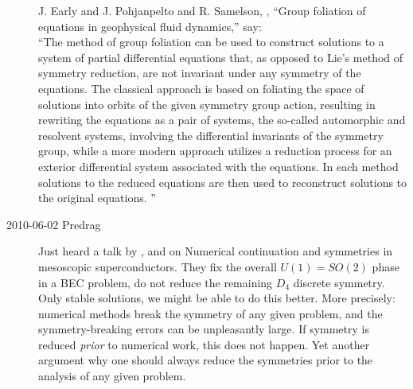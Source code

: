 \begin{description}
J. Early and J. Pohjanpelto and R. Samelson,
,
{``Group foliation of equations in geophysical fluid dynamics,''}
say:\\
``The method of group foliation can be used to construct solutions
to a system of partial differential equations that, as opposed to Lie's method of
symmetry reduction, are not invariant under any symmetry of the equations.
The classical approach is based on foliating the space of solutions into orbits
of the given symmetry group action, resulting in rewriting the equations as a
pair of systems, the so-called automorphic and resolvent systems, involving the
differential invariants of the symmetry group, while a more modern approach
utilizes a reduction process for an exterior differential system associated with
the equations. In each method solutions to the reduced equations are then used
to reconstruct solutions to the original equations.
''



\item[2010-06-02 Predrag] Just heard a talk by
,
 and
 on
{Numerical continuation and symmetries} in mesoscopic superconductors.
They fix the overall $U(1)=SO(2)$ phase in a BEC problem, do not
reduce the remaining $D_4$ discrete symmetry. Only stable solutions,
we might be able to do this better.
													\toCB
More precisely: numerical methods
break the symmetry of any given problem, and the symmetry-breaking
errors can be unpleasantly large. If symmetry is reduced {\em prior}
to numerical work, this does not happen. Yet another argument why
one should always reduce the symmetries prior to the analysis of any
given problem.



\end{description}
